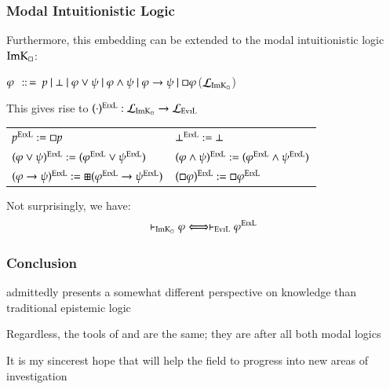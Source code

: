 \begin{frame}[allowframebreaks]
\frametitle{Modal Intuitionistic Logic}

Furthermore, this embedding can be extended to the modal intuitionistic logic
$\operatorname{ImK}_{\Box }$:

\vspace{.2cm}

{\hspace*{\fill}}$\varphi \text{ } \,::\, = \text{ } p \text{ } | \text{ } \bot
\text{ } | \text{ } \varphi \vee \psi \text{ } | \text{ } \varphi \wedge \psi \text{
} | \text{ } \varphi \rightarrow \psi \text{ } | \text{ } \Box 
\varphi${\hspace*{\fill}}($\mathcal{L}_{\operatorname{ImK}_{\Box }}$)

\framebreak

This gives rise to $(\cdot)^{\text{{\scshape{EixL}}}} :
\text{$\mathcal{L}_{\operatorname{ImK}_{\Box }}$} \rightarrow
\mathcal{L}_{\text{{\scshape{EviL}}}}$

\begin{center}
  \begin{tabular}{ll}
    $p^{\text{{\scshape{EixL}}}} := \Box p$ &
    $\bot^{\text{{\scshape{EixL}}}} := \bot$\\
    $(\varphi \vee \psi)^{\text{{\scshape{EixL}}}} :=
    (\varphi^{\text{{\scshape{EixL}}}} \vee \psi^{\text{{\scshape{EixL}}}})^{}$ &
    $(\varphi \wedge \psi)^{\text{{\scshape{EixL}}}} :=
    (\varphi^{\text{{\scshape{EixL}}}} \wedge \psi^{\text{{\scshape{EixL}}}})^{}$\\
    $(\varphi \rightarrow \psi)^{\text{{\scshape{EixL}}}} := \boxplus
    (\varphi^{\text{{\scshape{EixL}}}} \rightarrow \psi^{\text{{\scshape{EixL}}}})$
    & $(\Box  \varphi)^{\text{{\scshape{EixL}}}} := \Box 
    \varphi^{\text{{\scshape{EixL}}}}$
  \end{tabular}
\end{center}

\vspace{.2cm}

Not surprisingly, we have:
\[ \vdash_{\operatorname{ImK}_{\Box }} \varphi \Longleftrightarrow
   \vdash_{\text{{\scshape{EviL}}}} \varphi^{\text{{\scshape{EixL}}}} \]
\end{frame}

\begin{frame}
\frametitle{Conclusion}

 admittedly presents a somewhat different perspective on
knowledge than traditional epistemic logic

\vspace{.5cm}

Regardless, the tools of  and  are the same; they
are after all both modal logics

\vspace{.5cm}

It is my sincerest hope that  will help the field to progress
into new areas of investigation
\end{frame}
% 

